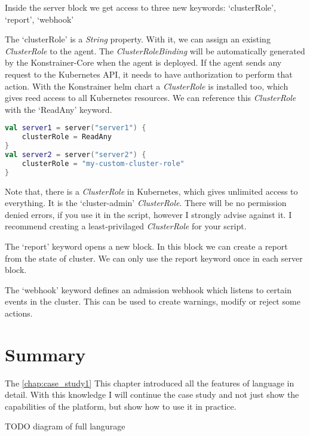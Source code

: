 Inside the server block we get access to three new keywords: `clusterRole', `report', `webhook'

The `clusterRole' is a \emph{String} property. With it, we can assign an existing \emph{ClusterRole} to the agent. The \emph{ClusterRoleBinding} will be automatically generated by the Konstrainer-Core when the agent is deployed. If the agent sends any request to the Kubernetes API, it needs to have authorization to perform that action. With the Konstrainer helm chart a \emph{ClusterRole} is installed too, which gives reed access to all Kubernetes resources. We can reference this \emph{ClusterRole} with the `ReadAny' keyword.

\begin{lstlisting}[caption={Usage of the clusterRole keyword},language=Kotlin,label=code:clusterrole_usage]
val server1 = server("server1") {
    clusterRole = ReadAny
}
val server2 = server("server2") {
    clusterRole = "my-custom-cluster-role"
}
\end{lstlisting}

Note that, there is a \emph{ClusterRole} in Kubernetes, which gives unlimited access to everything. It is the `cluster-admin' \emph{ClusterRole}. There will be no permission denied errors, if you use it in the script, however I strongly advise against it. I recommend creating a least-privilaged \emph{ClusterRole} for your script.

The `report' keyword opens a new block. In this block we can create a report from the state of cluster. We can only use the report keyword once in each server block.

The `webhook' keyword defines an admission webhook which listens to certain events in the cluster. This can be used to create warnings, modify or reject some actions.





\section{Summary}

The \ref{chap:case_study1}
This chapter introduced all the features of language in detail. With this knowledge I will continue the case study and not just show the capabilities of the platform, but show how to use it in practice.

TODO diagram of full langurage


